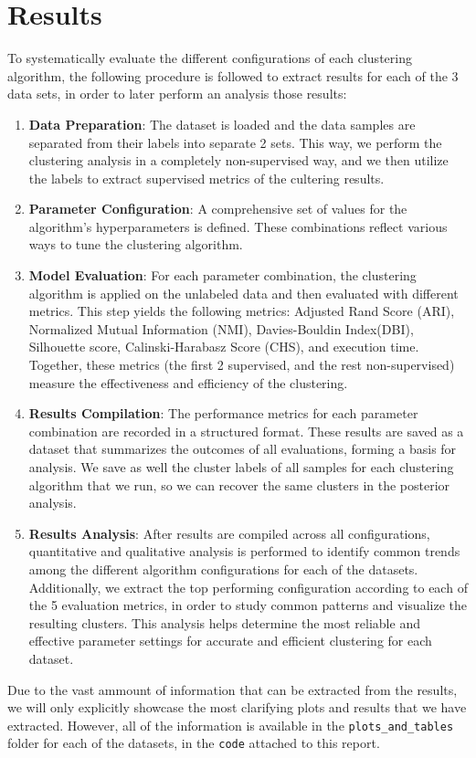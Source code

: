 \section{Results}\label{sec:results}
To systematically evaluate the different configurations of each clustering algorithm, the following procedure is followed to extract results for each of the 3 data sets, in order to later perform an analysis those results:

\begin{enumerate}
    \item \textbf{Data Preparation}: The dataset is loaded and the data samples are separated from their labels into separate 2 sets. This way, we perform the clustering analysis in a completely non-supervised way, and we then utilize the labels to extract supervised metrics of the cultering results.

    \item \textbf{Parameter Configuration}: A comprehensive set of values for the algorithm's hyperparameters is defined. These combinations reflect various ways to tune the clustering algorithm.

    \item \textbf{Model Evaluation}: For each parameter combination, the clustering algorithm is applied on the unlabeled data and then evaluated with different metrics. This step yields the following metrics: Adjusted Rand Score (ARI), Normalized Mutual Information (NMI), Davies-Bouldin Index(DBI), Silhouette score, Calinski-Harabasz Score (CHS), and execution time. Together, these metrics (the first 2 supervised, and the rest non-supervised) measure the effectiveness and efficiency of the clustering.

    \item \textbf{Results Compilation}: The performance metrics for each parameter combination are recorded in a structured format. These results are saved as a dataset that summarizes the outcomes of all evaluations, forming a basis for analysis. We save as well the cluster labels of all samples for each clustering algorithm that we run, so we can recover the same clusters in the posterior analysis.

    \item \textbf{Results Analysis}: After results are compiled across all configurations, quantitative and qualitative analysis is performed to identify common trends among the different algorithm configurations for each of the datasets. Additionally, we extract the top performing configuration according to each of the 5 evaluation metrics, in order to study common patterns and visualize the resulting clusters. This analysis helps determine the most reliable and effective parameter settings for accurate and efficient clustering for each dataset.
\end{enumerate}
Due to the vast ammount of information that can be extracted from the results, we will only explicitly showcase the most clarifying plots and results that we have extracted. However, all of the information is available in the \texttt{plots\_and\_tables} folder for each of the datasets, in the \texttt{code} attached to this report.

